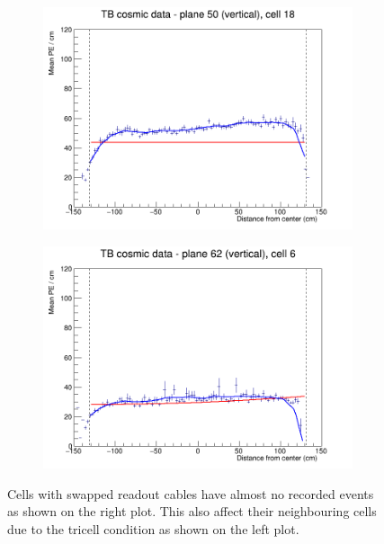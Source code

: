 \documentclass[12pt,a4paper]{article}
\begin{document}
\begin{figure}[h]
  \begin{subfigure}{0.5\textwidth}
    \includegraphics[width=\linewidth]{RelativeCalibrationResults/ep3de_050_018.png}
  \end{subfigure}
  \begin{subfigure}{0.5\textwidth}
    \includegraphics[width=\linewidth]{RelativeCalibrationResults/ep3de_062_006.png}
  \end{subfigure}
  \caption{Cells with swapped readout cables have almost no recorded events as shown on the right plot. This also affect their neighbouring cells due to the tricell condition as shown on the left plot.}
  \label{figAttenfitResultsEpoch3de_CellEdges}
\end{figure}
\end{document}
